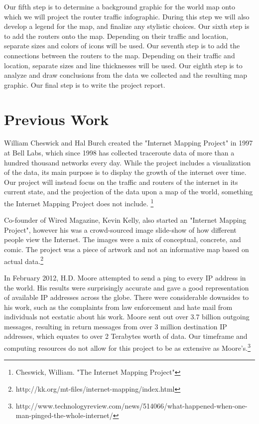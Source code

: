 \documentclass{sigcomm-alternate}
\begin{document}
Our fifth step is to determine a background graphic for the world map onto which we will project the router traffic infographic. During this step we will also develop a legend for the map, and finalize any stylistic choices. Our sixth step is to add the routers onto the map. Depending on their traffic and location, separate sizes and colors of icons will be used. Our seventh step is to add the connections between the routers to the map. Depending on their traffic and location, separate sizes and line thicknesses will be used. Our eighth step is to analyze and draw conclusions from the data we collected and the resulting map graphic. Our final step is to write the project report.


\section{Previous Work}

William Cheswick and Hal Burch created the "Internet Mapping Project" in 1997 at Bell Labs, which since 1998 has collected traceroute data of more than a hundred thousand networks every day. While the project includes a visualization of the data, its main purpose is to display the growth of the internet over time. Our project will instead focus on the traffic and routers of the internet in its current state, and the projection of the data upon a map of the world, something the Internet Mapping Project does not include. \footnote{Cheswick, William. "The Internet Mapping Project"}

Co-founder of Wired Magazine, Kevin Kelly, also started an "Internet Mapping Project", however his was a crowd-sourced image slide-show of how different people view the Internet. The images were a mix of conceptual, concrete, and comic. The project was a piece of artwork and not an informative map based on actual data.\footnote{http://kk.org/mt-files/internet-mapping/index.html}

In February 2012, H.D. Moore attempted to send a ping to every IP address in the world. His results were surprisingly accurate and gave a good representation of available IP addresses across the globe. There were considerable downsides to his work, such as the complaints from law enforcement and hate mail from individuals not ecstatic about his work. Moore sent out over 3.7 billion outgoing messages, resulting in return messages from over 3 million destination IP addresses,  which equates to over 2 Terabytes worth of data.  Our timeframe and computing resources do not allow for this project to be as extensive as Moore's.\footnote{http://www.technologyreview.com/news/514066/what-happened-when-one-man-pinged-the-whole-internet/}
\end{document}
